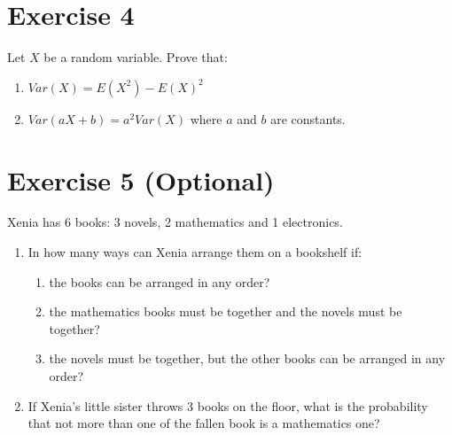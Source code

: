 \documentclass[12pt,thmsa]{article}
\begin{document}
\section*{Exercise 4}

Let $X$ be a random variable. Prove that: 
\begin{enumerate}
  \item $Var(X)=E(X^2)-E(X)^2$
  \item $Var(aX+b)=a^2 Var(X)$ where $a$ and $b$ are constants.
\end{enumerate}















\section*{Exercise 5 (Optional)}

Xenia has 6 books: 3 novels, 2 mathematics and 1 electronics.
\begin{enumerate}
  \item In how many ways can Xenia arrange them on a bookshelf if:
\begin{enumerate}
  \item the books can be arranged in any order?
  \item the mathematics books must be together and the novels must be together?
  \item the novels must be together, but the other books can be arranged in any order?
\end{enumerate}
  \item If Xenia's little sister throws 3 books on the floor, what is the probability that not more than one of the fallen book
  is a mathematics one?
\end{enumerate}
\end{document}
